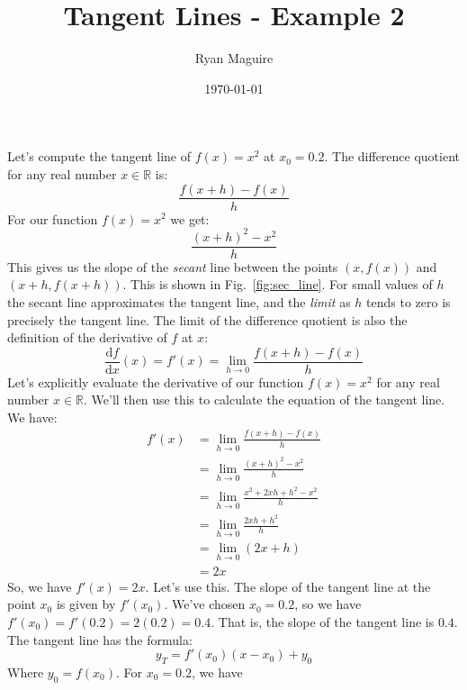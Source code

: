 \documentclass{article}
\title{Tangent Lines - Example 2}
\author{Ryan Maguire}
\date{\today}
\begin{document}
    \maketitle
    Let's compute the tangent line of $f(x)=x^{2}$ at $x_{0}=0.2$. The
    difference quotient for any real number $x\in\mathbb{R}$ is:
    \begin{equation}
        \frac{f(x+h)-f(x)}{h}
    \end{equation}
    For our function $f(x)=x^{2}$ we get:
    \begin{equation}
        \frac{(x+h)^{2}-x^{2}}{h}
    \end{equation}
    This gives us the slope of the \textit{secant} line between the points
    $(x,f(x))$ and $(x+h,f(x+h))$. This is shown in Fig.~\ref{fig:sec_line}.
    For small values of $h$ the secant line
    approximates the tangent line, and the \textit{limit} as $h$ tends to zero
    is precisely the tangent line. The limit of the difference quotient is also
    the definition of the derivative of $f$ at $x$:
    \begin{equation}
        \frac{\textrm{d}f}{\textrm{d}x}(x)
            =f'(x)
            =\lim_{h\rightarrow{0}}\frac{f(x+h)-f(x)}{h}
    \end{equation}
    Let's explicitly evaluate the derivative of our function $f(x)=x^{2}$ for
    any real number $x\in\mathbb{R}$. We'll then use this to calculate the
    equation of the tangent line. We have:
    \begin{align}
        f'(x)&=\lim_{h\rightarrow{0}}\frac{f(x+h)-f(x)}{h}\\
            &=\lim_{h\rightarrow{0}}\frac{(x+h)^{2}-x^{2}}{h}\\
            &=\lim_{h\rightarrow{0}}\frac{x^{2}+2xh+h^{2}-x^{2}}{h}\\
            &=\lim_{h\rightarrow{0}}\frac{2xh+h^{2}}{h}\\
            &=\lim_{h\rightarrow{0}}(2x+h)\\
            &=2x
    \end{align}
    So, we have $f'(x)=2x$. Let's use this. The slope of the tangent line
    at the point $x_{0}$ is given by $f'(x_{0})$. We've chosen $x_{0}=0.2$, so
    we have $f'(x_{0})=f'(0.2)=2(0.2)=0.4$. That is, the slope of the tangent
    line is $0.4$. The tangent line has the formula:
    \begin{equation}
        y_{T}=f'(x_{0})(x-x_{0})+y_{0}
    \end{equation}
    Where $y_{0}=f(x_{0})$. For $x_{0}=0.2$, we have
\end{document}
